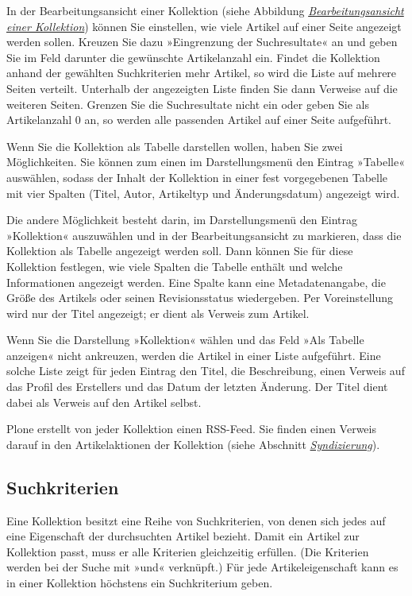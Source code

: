 \documentclass[a4paper,12pt,ngerman]{manual}
\begin{document}
In der Bearbeitungsansicht einer Kollektion (siehe Abbildung
\hyperlink{fig-kollektion-bearbeiten}{\emph{Bearbeitungsansicht einer Kollektion}}) können Sie einstellen, wie viele
Artikel auf einer Seite angezeigt werden sollen. Kreuzen Sie dazu
»Eingrenzung der Suchresultate« an und geben Sie im Feld darunter die
gewünschte Artikelanzahl ein. Findet die Kollektion anhand der
gewählten Suchkriterien mehr Artikel, so wird die Liste auf mehrere
Seiten verteilt. Unterhalb der angezeigten Liste finden Sie dann
Verweise auf die weiteren Seiten.  Grenzen Sie die Suchresultate nicht
ein oder geben Sie als Artikelanzahl 0 an, so werden alle passenden
Artikel auf einer Seite aufgeführt.

Wenn Sie die Kollektion als Tabelle darstellen wollen, haben Sie zwei
Möglichkeiten. Sie können zum einen im Darstellungsmenü den Eintrag »Tabelle«
auswählen, sodass der Inhalt der Kollektion in einer fest vorgegebenen Tabelle
mit vier Spalten (Titel, Autor, Artikeltyp und Änderungsdatum) angezeigt wird.

Die andere Möglichkeit besteht darin, im Darstellungsmenü den Eintrag
»Kollektion« auszuwählen und in der Bearbeitungsansicht zu markieren, dass die
Kollektion als Tabelle angezeigt werden soll. Dann können Sie für diese
Kollektion festlegen, wie viele Spalten die Tabelle enthält und welche
Informationen angezeigt werden. Eine Spalte kann eine Metadatenangabe, die
Größe des Artikels oder seinen Revisionsstatus wiedergeben. Per Voreinstellung
wird nur der Titel angezeigt; er dient als Verweis zum Artikel.

Wenn Sie die Darstellung »Kollektion« wählen und das Feld »Als Tabelle
anzeigen« nicht ankreuzen, werden die Artikel in einer Liste aufgeführt. Eine
solche Liste zeigt für jeden Eintrag den Titel, die Beschreibung, einen
Verweis auf das Profil des Erstellers und das Datum der letzten Änderung. Der
Titel dient dabei als Verweis auf den Artikel selbst.

Plone erstellt von jeder Kollektion einen RSS-Feed. Sie finden einen Verweis
darauf in den Artikelaktionen der Kollektion (siehe
Abschnitt \hyperlink{sec-syndizierung}{\emph{Syndizierung}}).


\subsection{Suchkriterien}

Eine Kollektion besitzt eine Reihe von Suchkriterien, von denen sich jedes auf
eine Eigenschaft der durchsuchten Artikel bezieht. Damit ein Artikel zur
Kollektion passt, muss er alle Kriterien gleichzeitig erfüllen. (Die Kriterien
werden bei der Suche mit »und« verknüpft.) Für jede Artikeleigenschaft kann es
in einer Kollektion höchstens ein Suchkriterium geben.
\end{document}
